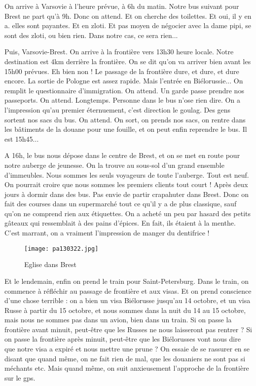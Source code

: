 \documentclass{book}
\begin{document}
On arrive à Varsovie à l'heure prévue, à 6h du matin. Notre bus suivant pour Brest ne part qu'à 9h. Donc on attend. Et on cherche des toilettes. Et oui, il y en a. elles sont payantes. Et en zloti. Et pas moyen de négocier avec la dame pipi, se sont des zloti, ou bien rien. Dans notre cas, ce sera rien...

Puis, Varsovie-Brest. On arrive à la frontière vers 13h30 heure locale. Notre destination est 4km derrière la frontière. On se dit qu'on va arriver bien avant les 15h00 prévues. Eh bien non ! Le passage de la frontière dure, et dure, et dure encore. La sortie de Pologne est assez rapide. Mais l'entrée en Biélorussie... On remplit le questionnaire d'immigration. On attend. Un garde passe prendre nos passeports. On attend. Longtemps. Personne dans le bus n'ose rien dire. On a l'impression qu'au premier éternuement, c'est direction le goulag. Des gens sortent nos sacs du bus. On attend. On sort, on prends nos sacs, on rentre dans les bâtiments de la douane pour une fouille, et on peut enfin reprendre le bus.
Il est 15h45...

A 16h, le bus nous dépose dans le centre de Brest, et on se met en route pour notre auberge de jeunesse. On la trouve au sous-sol d'un grand ensemble d'immeubles. Nous sommes les seuls voyageurs de toute l'auberge. Tout est neuf. On pourrait croire que nous sommes les premiers clients tout court ! Après deux jours à dormir dans des bus. Pas envie de partir crapahuter dans Brest. Donc on fait des courses dans un supermarché tout ce qu'il y a de plus classique, sauf qu'on ne comprend rien aux étiquettes. On a acheté un peu par hasard des petits gâteaux qui ressemblait à des pains d'épices. En fait, ils étaient à la menthe. C'est marrant, on a vraiment l'impression de manger du dentifrice !

\begin{figure}[h]
\centering
\texttt{[image: pa130322.jpg]}
\caption*{Eglise dans Brest}
\end{figure}
Et le lendemain, enfin on prend le train pour Saint-Petersburg.
Dans le train, on commence à réfléchir au passage de frontière et aux visas. Et on prend conscience d'une chose terrible : on a bien un visa Biélorusse jusqu'au 14 octobre, et un visa Russe à partir du 15 octobre, et nous sommes dans la nuit du 14 au 15 octobre, mais nous ne sommes pas dans un avion, bien dans un train. Si on passe la frontière avant minuit, peut-être que les Russes ne nous laisseront pas rentrer ? Si on passe la frontière après minuit, peut-être que les Biélorusses vont nous dire que notre visa a expiré et nous mettre une prune ? On essaie de se rassurer en se disant que quand même, on ne fait rien de mal, que les douaniers ne sont pas si méchants etc. Mais quand même, on suit anxieusement l'approche de la frontière sur le gps.
\end{document}
